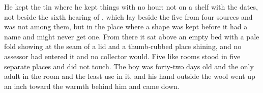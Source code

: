 He kept the tin where he kept things with no hour: not on a shelf with the dates, not beside the sixth hearing of , which lay beside the five from four sources and was not among them, but in the place where a shape was kept before it had a name and might never get one. From there it sat above an empty bed with a pale fold showing at the seam of a lid and a thumb-rubbed place shining, and no assessor had entered it and no collector would. Five like rooms stood in five separate places and did not touch. The boy was forty-two days old and the only adult in the room and the least use in it, and his hand outside the wool went up an inch toward the warmth behind him and came down.
